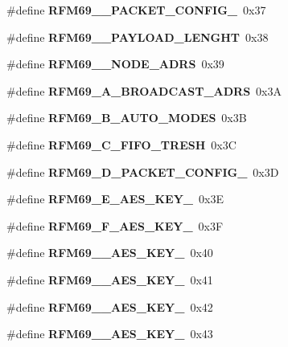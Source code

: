 \begin{DoxyCompactItemize}
\item 
\mbox{\label{_r_f_m69__registri_8h_ae9e1d7ff94a6b29d75c87c7cf939dd8a}} 
\#define {\bfseries R\+F\+M69\+\_\+\_\+\+P\+A\+C\+K\+E\+T\+\_\+\+C\+O\+N\+F\+I\+G\+\_}~0x37
\item 
\mbox{\label{_r_f_m69__registri_8h_a593d815e8b616444cb8a8d2e5979d31a}} 
\#define {\bfseries R\+F\+M69\+\_\+\_\+\+P\+A\+Y\+L\+O\+A\+D\+\_\+\+L\+E\+N\+G\+HT}~0x38
\item 
\mbox{\label{_r_f_m69__registri_8h_a5a8ffd2022ba8923a9f725f272a5b57d}} 
\#define {\bfseries R\+F\+M69\+\_\+\_\+\+N\+O\+D\+E\+\_\+\+A\+D\+RS}~0x39
\item 
\mbox{\label{_r_f_m69__registri_8h_ad0fb760c343473d60b21d8e35b81fd74}} 
\#define {\bfseries R\+F\+M69\+\_\+A\+\_\+\+B\+R\+O\+A\+D\+C\+A\+S\+T\+\_\+\+A\+D\+RS}~0x3A
\item 
\mbox{\label{_r_f_m69__registri_8h_a3bfd1096435209cd9a63ad146a59729b}} 
\#define {\bfseries R\+F\+M69\+\_\+B\+\_\+\+A\+U\+T\+O\+\_\+\+M\+O\+D\+ES}~0x3B
\item 
\mbox{\label{_r_f_m69__registri_8h_aef824a8409bffb487a9b47af116934ed}} 
\#define {\bfseries R\+F\+M69\+\_\+C\+\_\+\+F\+I\+F\+O\+\_\+\+T\+R\+E\+SH}~0x3C
\item 
\mbox{\label{_r_f_m69__registri_8h_a753206492841c642b99821c33641b4f4}} 
\#define {\bfseries R\+F\+M69\+\_\+D\+\_\+\+P\+A\+C\+K\+E\+T\+\_\+\+C\+O\+N\+F\+I\+G\+\_}~0x3D
\item 
\mbox{\label{_r_f_m69__registri_8h_a4caac8e71fea8425de3916972a6c3578}} 
\#define {\bfseries R\+F\+M69\+\_\+E\+\_\+\+A\+E\+S\+\_\+\+K\+E\+Y\+\_}~0x3E
\item 
\mbox{\label{_r_f_m69__registri_8h_aac05894cf669b5540e7c44da801b5bdd}} 
\#define {\bfseries R\+F\+M69\+\_\+F\+\_\+\+A\+E\+S\+\_\+\+K\+E\+Y\+\_}~0x3F
\item 
\mbox{\label{_r_f_m69__registri_8h_aa7967722e2d0223b2536e62bd857848d}} 
\#define {\bfseries R\+F\+M69\+\_\+\_\+\+A\+E\+S\+\_\+\+K\+E\+Y\+\_}~0x40
\item 
\mbox{\label{_r_f_m69__registri_8h_ac67e00dcc1e1d28f3ac80554d67bb528}} 
\#define {\bfseries R\+F\+M69\+\_\+\_\+\+A\+E\+S\+\_\+\+K\+E\+Y\+\_}~0x41
\item 
\mbox{\label{_r_f_m69__registri_8h_a02d8eb5fb11191ae8e7a20bfd100420e}} 
\#define {\bfseries R\+F\+M69\+\_\+\_\+\+A\+E\+S\+\_\+\+K\+E\+Y\+\_}~0x42
\item 
\mbox{\label{_r_f_m69__registri_8h_aa558003f813c8096371e930d55dcdedd}} 
\#define {\bfseries R\+F\+M69\+\_\+\_\+\+A\+E\+S\+\_\+\+K\+E\+Y\+\_}~0x43

\end{DoxyCompactItemize}
